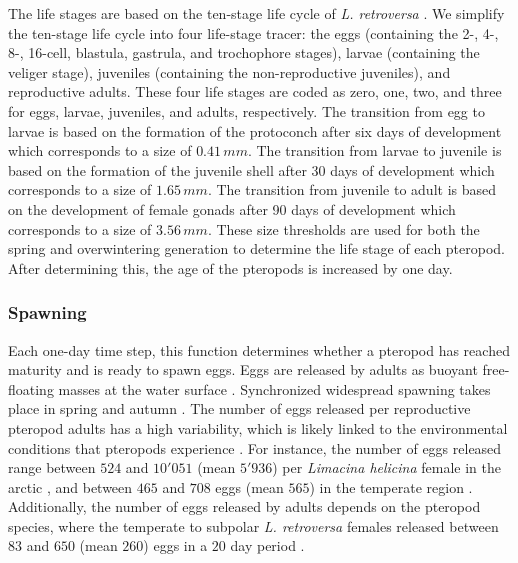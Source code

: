 The life stages are based on the ten-stage life cycle of \textit{L. retroversa} \citep{Howes2014Lab,Thabet2015Lifestages}. We simplify the ten-stage life cycle into four life-stage tracer:  the eggs (containing the 2-, 4-, 8-, 16-cell, blastula, gastrula, and trochophore stages), larvae (containing the veliger stage), juveniles (containing the non-reproductive juveniles), and reproductive adults. These four life stages are coded as zero, one, two, and three for eggs, larvae, juveniles, and adults, respectively. The transition from egg to larvae is based on the formation of the protoconch after six days of development \citep{Thabet2015Lifestages} which corresponds to a size of $0.41 \, mm$. The transition from larvae to juvenile is based on the formation of the juvenile shell after 30 days of development \citep{Thabet2015Lifestages} which corresponds to a size of $1.65 \, mm$. The transition from juvenile to adult is based on the development of female gonads after 90 days of development \citep{Thabet2015Lifestages} which corresponds to a size of $3.56 \, mm$. These size thresholds are used for both the spring and overwintering generation to determine the life stage of each pteropod. After determining this, the age of the pteropods is increased by one day.


\subsubsection{Spawning}
Each one-day time step, this function determines whether a pteropod has reached maturity and is ready to spawn eggs. Eggs are released by adults as buoyant free-floating masses at the water surface \citep{Lalli1978Reproduction,Paranjape1968egg,Schalk1990SeasonalSpatial,Gannefors2005Overwintering,Comeau2010Predation,Manno2016EggsAcidification}. Synchronized widespread spawning takes place in spring and autumn \citep{lalli1989pelagic,Thabet2015Lifestages,Wang2017Lifecycle}. The number of eggs released per reproductive pteropod adults has a high variability, which is likely linked to the environmental conditions that pteropods experience \citep{Manno2016EggsAcidification}. For instance, the number of eggs released range between $524$ and $10'051$ (mean $5'936$) per \textit{Limacina helicina} female in the arctic \citep{Lalli1978Reproduction}, and between $465$ and $708$ eggs (mean $565$) in the temperate region \citep{Paranjape1968egg}. Additionally, the number of eggs released by adults depends on the pteropod species, where the temperate to subpolar \textit{L. retroversa} females released  between $83$ and $650$ (mean $260$) eggs in a $20$ day period \citep{Lalli1978Reproduction}.

